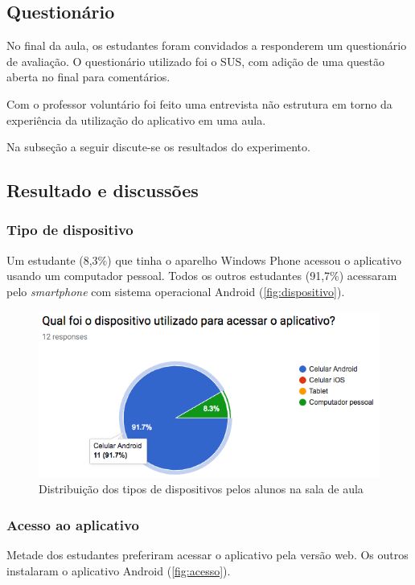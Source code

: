 \subsection{Questionário}

No final da aula, os estudantes foram convidados a responderem um questionário de avaliação.
O questionário utilizado foi o SUS, com adição de uma questão aberta no final para comentários.

Com o professor voluntário foi feito uma entrevista não estrutura em torno da experiência da
utilização do aplicativo em uma aula.

Na subseção a seguir discute-se os resultados do experimento.

\clearpage
\subsection{Resultado e discussões}

\subsubsection{Tipo de dispositivo}
Um estudante (8,3\%) que tinha o aparelho Windows Phone acessou o aplicativo usando um computador pessoal.
Todos os outros estudantes (91,7\%) acessaram pelo \textit{smartphone} com sistema operacional Android (\autoref{fig:dispositivo}).

\begin{figure}[H]
  \centering
  \caption{Distribuição dos tipos de dispositivos pelos alunos na sala de aula}
  \label{fig:dispositivo}
  \includegraphics[scale=.6]{imagens/dispositivo}
  \doautor
\end{figure}

\subsubsection{Acesso ao aplicativo}
Metade dos estudantes preferiram acessar o aplicativo pela versão web.
Os outros instalaram o aplicativo Android (\autoref{fig:acesso}).

